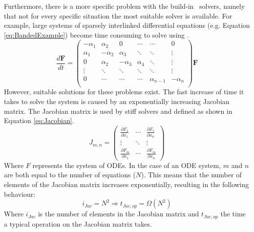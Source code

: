 
Furthermore, there is a more specific problem with the build-in \MATLAB~solvers, namely that not for every specific situation the most suitable solver is available. For example, large systems of sparsely interlinked differential equations (e.g. Equation \ref{eq:BandedExample}) become time consuming to solve using \MATLAB.
\begin{equation} \label{eq:BandedExample}
  \frac{d\mathbf{F}}{dt} =
  \begin{pmatrix}
   -\alpha_1 & \alpha_2 & 0 & \cdots & \cdots & 0 \\
   \alpha_1 & -\alpha_2 & \alpha_3 & \ddots & \ddots & \vdots \\
   0 & \alpha_2 & -\alpha_3 & \alpha_4  & \ddots & \vdots \\
   \vdots & \ddots & \ddots & \ddots & \ddots & \vdots  \\
   0 & \cdots & \cdots & \cdots & \alpha_{n-1} & -\alpha_{n} \\
  \end{pmatrix}
  \mathbf{F}
\end{equation}
However, suitable solutions for these problems exist. The fast increase of time it takes to solve the system is caused by an exponentially increasing Jacobian matrix. The Jacobian matrix is used by stiff solvers and defined as shown in Equation \ref{eq:Jacobian}.
\begin{equation} \label{eq:Jacobian}
  J_{m,n} =
  \begin{pmatrix}
   \frac{\partial F_1}{\partial x_1} & \cdots & \frac{\partial F_1}{\partial x_n} \\
   \vdots & \ddots & \vdots  \\
   \frac{\partial F_m}{\partial x_1} & \cdots & \frac{\partial F_m}{\partial x_n}
  \end{pmatrix}
\end{equation}
Where $F$ represents the system of ODEs. In the case of an ODE system, $m$ and $n$ are both equal to the number of equations ($N$). This means that the number of elements of the Jacobian matrix increases exponentially, resulting in the following behaviour:
\begin{equation}
 i_{Jac} = N^2 \Rightarrow
 t_{Jac,op} = \Omega(N^2)
\end{equation}
Where $i_{Jac}$ is the number of elements in the Jacobian matrix and $t_{Jac,op}$ the time a typical operation on the Jacobian matrix takes.

